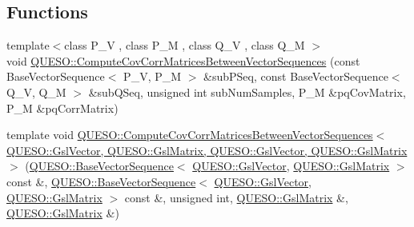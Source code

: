 \subsection*{Functions}
\begin{DoxyCompactItemize}
\item 
{\footnotesize template$<$class P\-\_\-\-V , class P\-\_\-\-M , class Q\-\_\-\-V , class Q\-\_\-\-M $>$ }\\void \hyperlink{namespace_q_u_e_s_o_ae194d12af9b08b130faf542b9b9ffe9b}{Q\-U\-E\-S\-O\-::\-Compute\-Cov\-Corr\-Matrices\-Between\-Vector\-Sequences} (const Base\-Vector\-Sequence$<$ P\-\_\-\-V, P\-\_\-\-M $>$ \&sub\-P\-Seq, const Base\-Vector\-Sequence$<$ Q\-\_\-\-V, Q\-\_\-\-M $>$ \&sub\-Q\-Seq, unsigned int sub\-Num\-Samples, P\-\_\-\-M \&pq\-Cov\-Matrix, P\-\_\-\-M \&pq\-Corr\-Matrix)
\item 
template void \hyperlink{_vector_sequence_8_c_aecab31ab77cd6b5c1c2ea18857131551}{Q\-U\-E\-S\-O\-::\-Compute\-Cov\-Corr\-Matrices\-Between\-Vector\-Sequences$<$ Q\-U\-E\-S\-O\-::\-Gsl\-Vector, Q\-U\-E\-S\-O\-::\-Gsl\-Matrix, Q\-U\-E\-S\-O\-::\-Gsl\-Vector, Q\-U\-E\-S\-O\-::\-Gsl\-Matrix $>$} (\hyperlink{class_q_u_e_s_o_1_1_base_vector_sequence}{Q\-U\-E\-S\-O\-::\-Base\-Vector\-Sequence}$<$ \hyperlink{class_q_u_e_s_o_1_1_gsl_vector}{Q\-U\-E\-S\-O\-::\-Gsl\-Vector}, \hyperlink{class_q_u_e_s_o_1_1_gsl_matrix}{Q\-U\-E\-S\-O\-::\-Gsl\-Matrix} $>$ const \&, \hyperlink{class_q_u_e_s_o_1_1_base_vector_sequence}{Q\-U\-E\-S\-O\-::\-Base\-Vector\-Sequence}$<$ \hyperlink{class_q_u_e_s_o_1_1_gsl_vector}{Q\-U\-E\-S\-O\-::\-Gsl\-Vector}, \hyperlink{class_q_u_e_s_o_1_1_gsl_matrix}{Q\-U\-E\-S\-O\-::\-Gsl\-Matrix} $>$ const \&, unsigned int, \hyperlink{class_q_u_e_s_o_1_1_gsl_matrix}{Q\-U\-E\-S\-O\-::\-Gsl\-Matrix} \&, \hyperlink{class_q_u_e_s_o_1_1_gsl_matrix}{Q\-U\-E\-S\-O\-::\-Gsl\-Matrix} \&)
\end{DoxyCompactItemize}


